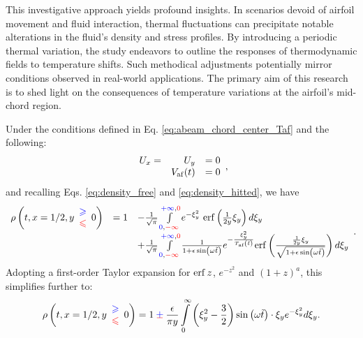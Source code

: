 This investigative approach yields profound insights. In scenarios devoid of airfoil movement and fluid interaction, thermal fluctuations can precipitate notable alterations in the fluid's density and stress profiles. By introducing a periodic thermal variation, the study endeavors to outline the responses of thermodynamic fields to temperature shifts. Such methodical adjustments potentially mirror conditions observed in real-world applications. The primary aim of this research is to shed light on the consequences of temperature variations at the airfoil's mid-chord region.

Under the conditions defined in Eq. \ref{eq:abeam_chord_center_Taf} and the following:
\begin{equation*}
\begin{array}{ r r l }
U_x = & U_y & =0\\
 & V_{\mathrm{af}} (t) & =0
\end{array}
,
\end{equation*}
and recalling Eqs. \ref{eq:density_free} and \ref{eq:density_hitted}, we have
\begin{equation*}
\begin{array}{ r l l }
\rho \left( t,x=1/2,y\begin{array}{ c }
\textcolor[rgb]{0,0,1}{\geqslant }\\
\textcolor[rgb]{1,0,0}{\leqslant }
\end{array} 0\right) & =1 & -\frac{1}{\sqrt{\pi }}\int\limits _{\textcolor[rgb]{0,0,1}{0} ,\textcolor[rgb]{1,0,0}{-\infty }}^{\textcolor[rgb]{0,0,1}{+\infty } ,\textcolor[rgb]{1,0,0}{0}} e^{-\xi _{y}^{2}}\,\erf\left(\frac{1}{2y} \xi _{y}\right) d\xi _{y}\\
 &  & +\frac{1}{\sqrt{\pi }}\int\limits _{\textcolor[rgb]{0,0,1}{0} ,\textcolor[rgb]{1,0,0}{-\infty }}^{\textcolor[rgb]{0,0,1}{+\infty } ,\textcolor[rgb]{1,0,0}{0}}\frac{1}{1+\epsilon \sin\left( \omega \tilde{t}\right)} e^{-\frac{\xi _{y}^{2}}{T_{\text{af}}\left(\tilde{t}\right)}}\mathrm{erf}\left(\frac{\frac{1}{2y} \xi _{y}}{\sqrt{1+\epsilon \sin\left( \omega \tilde{t}\right)}}\right) d\xi _{y}
\end{array}
.
\end{equation*}
Adopting a first-order Taylor expansion for $\operatorname{erf} z$, $e^{-z^2}$ and $(1+z)^a$, this simplifies further to:
\begin{equation}\label{eq:rho_before_Abramowitz}
\rho \left( t,x=1/2,y\begin{array}{ c }
\textcolor[rgb]{0,0,1}{\geqslant }\\
\textcolor[rgb]{1,0,0}{\leqslant }
\end{array} 0\right) =1\cpm \frac{\epsilon }{\pi y}\int\limits _{0}^{\infty }\left( \xi _{y}^{2} -\frac{3}{2}\right)\sin\left( \omega \tilde{t}\right) \cdot \xi _{y} e^{-\xi _{y}^{2}} d\xi _{y}
.
\end{equation}

